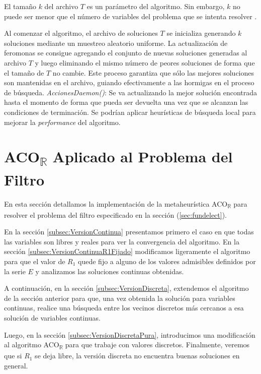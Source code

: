 \documentclass{llncs}
\begin{document}
	El tamaño $k$ del archivo $T$ es un parámetro del algoritmo. Sin embargo, $k$ no puede ser menor que el número de variables
	del problema que se intenta resolver \cite{soc:dor}.
	
	Al comenzar el algoritmo, el archivo de soluciones $T$ se inicializa generando $k$ soluciones mediante un muestreo aleatorio uniforme.
	La actualización de feromonas se consigue agregando el conjunto de nuevas soluciones generadas al archivo $T$ y luego eliminando
	el mismo número de peores soluciones de forma que el tamaño de $T$ no cambie. Este proceso garantiza que sólo las mejores
	soluciones son mantenidas en el archivo, guiando efectivamente a las hormigas en el proceso de búsqueda.
	\bigbreak
	\textit{AccionesDaemon()}: Se va actualizando la mejor solución encontrada hasta el momento de forma que pueda ser devuelta
	una vez que se alcanzan las condiciones de terminación. Se podrían aplicar heurísticas de búsqueda local para 
	mejorar la \textit{performance} del algoritmo.
	
	\section{\textbf{ACO\textsubscript{$\mathbb{R}$} Aplicado al Problema del Filtro}}
	\label{sec:acorfiltro}
	En esta sección detallamos la implementación de la metaheurística ACO\textsubscript{$\mathbb{R}$} 
	para resolver el problema del filtro especificado en la sección (\ref{sec:fundelect}).
	
	En la sección \ref{subsec:VersionContinua} presentamos primero el caso en que todas las variables 
	son libres y reales para ver la convergencia del algoritmo.  En la sección \ref{subsec:VersionContinuaR1Fijado}
	modificamos ligeramente el algoritmo para que el valor de $R_1$ quede fijo a alguno de los valores admisibles definidos por la serie $E$ 
	y analizamos las soluciones continuas obtenidas.
	
	A continuación, en la sección \ref{subsec:VersionDiscreta}, extendemos el algoritmo de la sección anterior
	para que, una vez obtenida la solución para variables continuas, 
	realice una búsqueda entre los vecinos discretos más cercanos a esa solución de variables continuas.
	
	Luego, en la sección \ref{subsec:VersionDiscretaPura}, introducimos una modificación al algoritmo 
	ACO\textsubscript{$\mathbb{R}$} para que trabaje con valores discretos. 
	Finalmente, veremos que si $R_1$ se deja libre, la versión discreta no encuentra buenas soluciones en general.
	
\end{document}
